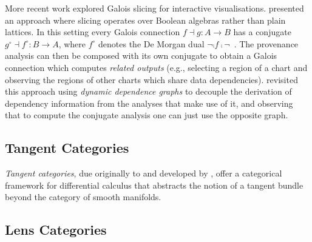 More recent work explored Galois slicing for interactive visualisations. \citet{perera22} presented an
approach where slicing operates over Boolean algebras rather than plain lattices. In this setting every Galois
connection $f \dashv g: A \to B$ has a conjugate $g^\circ \dashv f^\circ: B \to A$, where $f^\circ$ denotes
the De Morgan dual $\neg \comp f \comp \neg$~\cite{jonsson51}. The provenance analysis can then be composed
with its own conjugate to obtain a Galois connection which computes \emph{related outputs} (e.g., selecting a
region of a chart and observing the regions of other charts which share data dependencies). \citet{bond25}
revisited this approach using \emph{dynamic dependence graphs} to decouple the derivation of dependency
information from the analyses that make use of it, and observing that to compute the conjugate analysis one
can just use the opposite graph.

\subsection{Tangent Categories}

\emph{Tangent categories}, due originally to \citet{rosický84} and developed by \citet{cockett14,cockett18},
offer a categorical framework for differential calculus that abstracts the notion of a tangent bundle beyond
the category of smooth manifolds. 

\subsection{Lens Categories}

\cite{spivak19}

